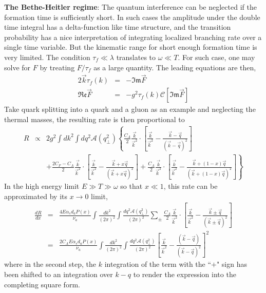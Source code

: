 {\bf The Bethe-Heitler regime}: The quantum interference can be neglected if the formation time is sufficiently short.
In such cases the amplitude under the double time integral has a delta-function like time structure, and the transition probability has a nice interpretation of integrating localized branching rate over a single time variable.
But the kinematic range for short enough formation time is very limited. 
The condition $\tau_f \ll \lambda$ translates to $\omega \ll T$.
For such case, one may solve for $F$ by treating $F/\tau_f$ as a large quantity.
The leading equations are then,
\begin{eqnarray}
2\vec{k}\tau_f(k) &=& - \mathfrak{Im} \vec{F} \\
\mathfrak{Re} \vec{F} &=& -g^2 \tau_f(k)\mathcal{C}[\mathfrak{Im} \vec{F}] 
\end{eqnarray}
Take quark splitting into a quark and a gluon as an example and neglecting the thermal masses, the resulting rate is then proportional to 
\begin{eqnarray}
R &\propto& 2g^2 \int d k^2 \int d q^2 \mathcal{A}(q_\perp^2) \left\{
\frac{C_A}{2} \frac{\vec{k}}{\vec{k}^2}\cdot\left[\frac{\vec{k}}{\vec{k}^2}-\frac{\vec{k}-\vec{q}}{(\vec{k}-\vec{q})^2}\right] \right.\\\nonumber
&&+\left. \frac{2C_F-C_A}{2} \frac{\vec{k}}{\vec{k}^2}\cdot\left[\frac{\vec{k}}{\vec{k}^2}-\frac{\vec{k}+x\vec{q}}{(\vec{k}+x\vec{q})^2}\right]
+\frac{C_A}{2} \frac{\vec{k}}{\vec{k}^2}\cdot\left[\frac{\vec{k}}{\vec{k}^2}-\frac{\vec{k}+(1-x)\vec{q}}{(\vec{k}+(1-x)\vec{q})^2}\right]
\right\}
\end{eqnarray}
In the high energy limit $E\gg T \gg \omega$ so that $x\ll 1$, this rate can be approximated by its $x\rightarrow 0$ limit, 
\begin{eqnarray}
\frac{dR}{dx} &=& \frac{4 E\alpha_s d_a P(x)}{\nu_a} \int \frac{dk^2}{(2\pi)^2} \int \frac{dq^2 \mathcal{A}(q_\perp^2)}{(2\pi)^2}  \sum_{\pm}
\frac{C_A}{2} \frac{\vec{k}}{\vec{k}^2}\cdot\left[\frac{\vec{k}}{\vec{k}^2}-\frac{\vec{k}\pm\vec{q}}{(\vec{k}\pm\vec{q})^2}\right] \\
&=& \frac{2 C_A E\alpha_s d_a P(x)}{\nu_a} \int \frac{dk^2}{(2\pi)^2} \int \frac{dq^2 \mathcal{A}(q_\perp^2)}{(2\pi)^2} 
\left[\frac{\vec{k}}{\vec{k}^2}-\frac{(\vec{k}-\vec{q})}{(\vec{k}-\vec{q})^2}\right]^2
\end{eqnarray}
where in the second step, the $k$ integration of the term with the ``$+$" sign has been shifted to an integration over $k-q$ to render the expression into the completing square form.
